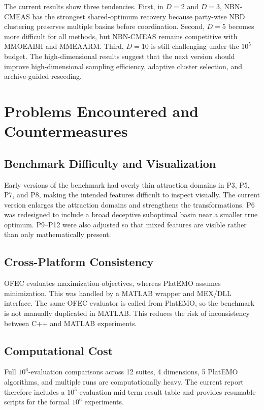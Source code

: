 \documentclass[12pt,a4paper]{article}
\begin{document}


The current results show three tendencies. First, in $D=2$ and $D=3$, NBN-CMEAS has
the strongest shared-optimum recovery because party-wise NBD clustering preserves
multiple basins before coordination. Second, $D=5$ becomes more difficult for all
methods, but NBN-CMEAS remains competitive with MMOEABH and MMEAARM. Third,
$D=10$ is still challenging under the $10^5$ budget. The high-dimensional results suggest
that the next version should improve high-dimensional sampling efficiency, adaptive
cluster selection, and archive-guided reseeding.

\section{Problems Encountered and Countermeasures}

\subsection{Benchmark Difficulty and Visualization}

Early versions of the benchmark had overly thin attraction domains in P3, P5, P7, and
P8, making the intended features difficult to inspect visually. The current version enlarges
the attraction domains and strengthens the transformations. P6 was redesigned to include
a broad deceptive suboptimal basin near a smaller true optimum. P9--P12 were also
adjusted so that mixed features are visible rather than only mathematically present.

\subsection{Cross-Platform Consistency}

OFEC evaluates maximization objectives, whereas PlatEMO assumes minimization. This
was handled by a MATLAB wrapper and MEX/DLL interface. The same OFEC evaluator is
called from PlatEMO, so the benchmark is not manually duplicated in MATLAB. This
reduces the risk of inconsistency between C++ and MATLAB experiments.

\subsection{Computational Cost}

Full $10^6$-evaluation comparisons across 12 suites, 4 dimensions, 5 PlatEMO algorithms,
and multiple runs are computationally heavy. The current report therefore includes a
$10^5$-evaluation mid-term result table and provides resumable scripts for the formal
$10^6$ experiments.
\end{document}
